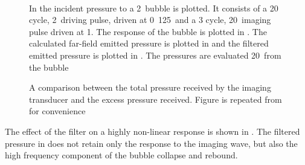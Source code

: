 \begin{figure}
  \centering
  \label{fig:FreqRatio}
  \qquad
  \\
  \centering
  \qquad
   \caption{In  the incident pressure to a \unit{2}\micro\meter\ bubble is plotted.
It consists of a 20 cycle, \unit{2}\mega\hertz\ driving pulse, driven at \unit{0.125}\mega\pascal\,
and a 3 cycle, \unit{20}\mega\hertz\ imaging pulse driven at  \unit{1}\mega\pascal.
The response of the bubble is plotted  in .
The calculated far-field emitted pressure   is plotted in 
and the filtered emitted pressure is plotted in  .  
The pressures are evaluated \unit{20}\milli\metre\ from the bubble }
  \label{fig:Filtered}
\end{figure}

\begin{figure}
  \centering
  \label{fig:DeltaPEffect:excess}
  \qquad
   \caption{A comparison between the total  pressure received by the imaging transducer 
     and the excess pressure received.
 Figure  is repeated from  for convenience
}
  \label{fig:DeltaPEffect}
\end{figure}



The effect of the filter on a highly non-linear response is shown in .
The filtered pressure in  does not retain only the response to the imaging wave,
but also the high frequency component of the bubble collapse and rebound.


